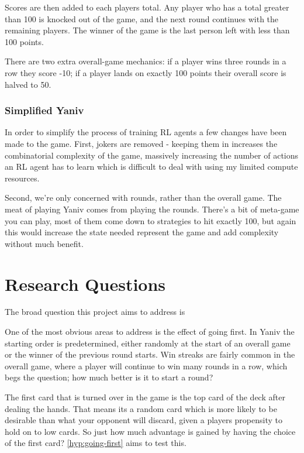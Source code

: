 \documentclass[../main.tex]{subfiles}
\begin{document}
Scores are then added to each players total. Any player who has a total greater than 100 is knocked out of the game, and the next round continues with the remaining players. The winner of the game is the last person left with less than 100 points.

There are two extra overall-game mechanics: if a player wins three rounds in a row they score -10; if a player lands on exactly 100 points their overall score is halved to 50.

\subsubsection{Simplified Yaniv}

In order to simplify the process of training RL agents a few changes have been made to the game. First, jokers are removed - keeping them in increases the combinatorial complexity of the game, massively increasing the number of actions an RL agent has to learn which is difficult to deal with using my limited compute resources. 

Second, we're only concerned with rounds, rather than the overall game. The meat of playing Yaniv comes from playing the rounds. There's a bit of meta-game you can play, most of them come down to strategies to hit exactly 100, but again this would increase the state needed represent the game and add complexity without much benefit. 

\section{Research Questions}
The broad question this project aims to address is 

One of the most obvious areas to address is the effect of going first. In Yaniv the starting order is predetermined, either randomly at the start of an overall game or the winner of the previous round starts. Win streaks are fairly common in the overall game, where a player will continue to win many rounds in a row, which begs the question; how much better is it to start a round? 

The first card that is turned over in the game is the top card of the deck after dealing the hands. That means its a random card which is more likely to be desirable than what your opponent will discard, given a players propensity to hold on to low cards. So just how much advantage is gained by having the choice of the first card? \cref{hyp:going-first} aims to test this.
\end{document}
